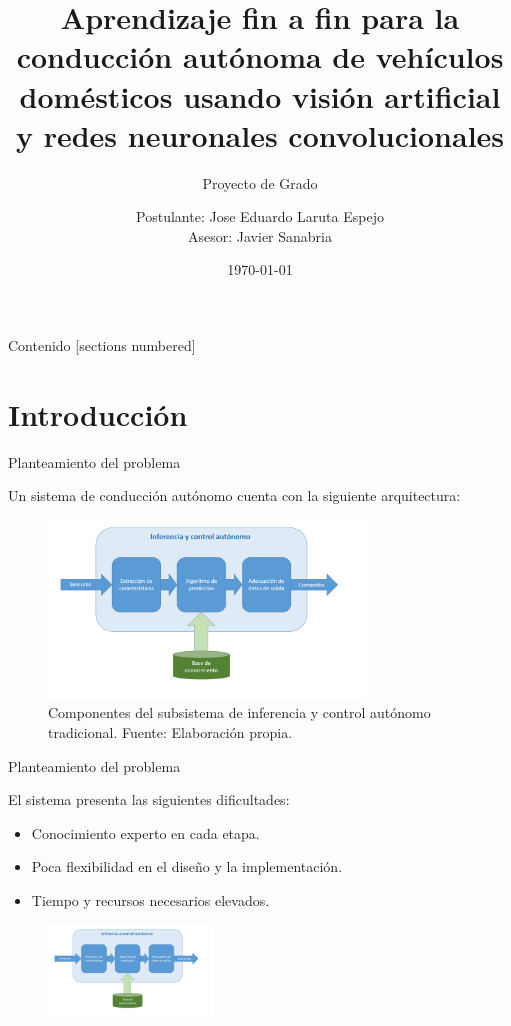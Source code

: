 \documentclass[10pt]{beamer}
\title{Aprendizaje fin a fin para la conducción autónoma de vehículos domésticos usando visión artificial y redes neuronales convolucionales}
\subtitle{Proyecto de Grado}
\date{\today}
\author{Postulante: Jose Eduardo Laruta Espejo \\ 
        Asesor: Javier Sanabria}
\institute{Universidad Mayor de San Andrés - Facultad de Ingeniería}
\begin{document}
\maketitle

\begin{frame}{Contenido}
  [sections numbered]
  \tableofcontents[hideallsubsections]
\end{frame}

\section{Introducción}


\begin{frame}[fragile]{Planteamiento del problema}

  Un sistema de conducción autónomo cuenta con la siguiente arquitectura:
  \begin{figure}[!h] 
    \centering
    \includegraphics[width=0.75\textwidth]{../img/inferencia}
    \caption[Inferencia y control autónomo tradicional]{Componentes del subsistema de inferencia y control autónomo tradicional. Fuente: Elaboración propia.}
\end{figure}

\end{frame}

\begin{frame}[fragile]{Planteamiento del problema}

    El sistema presenta las siguientes dificultades:
    \begin{itemize}
        \item \alert{Conocimiento experto} en cada etapa.
        \item \alert{Poca flexibilidad} en el diseño y la implementación.
        \item \alert{Tiempo y recursos} necesarios elevados.
    \end{itemize}
    \begin{figure}[!h] 
      \centering
      \includegraphics[width=0.39\textwidth]{../img/inferencia}
      \end{figure}
  
  \end{frame}
\end{document}
